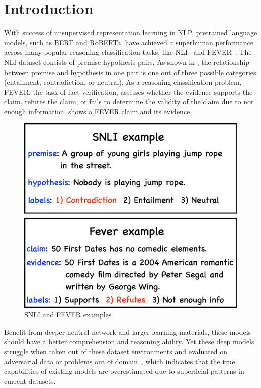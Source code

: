 \section{Introduction}
\label{intro}

With success of unsupervised representation learning in NLP, pretrained language 
models, such as BERT and RoBERTa, have achieved a superhuman 
performance across many popular reasoning classification tasks, like NLI~\cite{} and FEVER~\cite{}. 
The NLI dataset consists of premise-hypothesis pairs. 
As shown in , the relationship between premise and hypothesis in one pair
is one out of three   
possible categories (entailment, contradiction, or neutral).
As a reasoning classification problem,
FEVER, the task of fact verification, 
assesses whether the evidence supports the claim, refutes the claim, 
or fails to determine the validity of the claim due to not enough information. 
 shows 
a FEVER claim and its evidence.

\begin{figure}[th!]
	\centering
	\includegraphics[width=0.4\columnwidth]{figures/noise_example.eps}
	\caption{SNLI and FEVER examples}
	\label{fig:example}
\end{figure}

Benefit from deeper neutral 
network and larger learning materials, these models should have a better comprehension 
and reasoning ability. Yet these deep models struggle when taken out of these dataset environments and evaluated
on adversarial data or problems out of domain~\cite{},
which indicates that the true capabilities of existing models are overestimated due to superficial patterns in current datasets.

